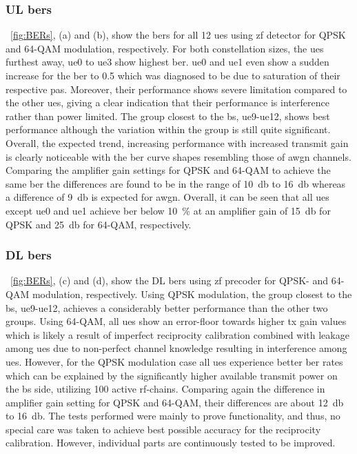 \documentclass[journal]{IEEEtran}
\begin{document}
\subsubsection{UL \glspl{ber}}
\label{subsubsec:indoor_UL_BERs}
\figurename~\ref{fig:BERs}, (a) and (b), show the \glspl{ber} for all 12 \glspl{ue} using \gls{zf} detector for QPSK and 64-QAM modulation, respectively.
%
%
%
%
%
%
%
%
%
%
%
%
%
For both constellation sizes, the \glspl{ue} furthest away, \gls{ue}0 to \gls{ue}3 show highest \gls{ber}.
\gls{ue}0 and \gls{ue}1 even show a sudden increase for the \gls{ber} to 0.5 which was diagnosed to be due to saturation of their respective \glspl{pa}.
Moreover, their performance shows severe limitation compared to the other \glspl{ue}, giving a clear indication that their performance is interference rather than power limited.  
The group closest to the \gls{bs}, \gls{ue}9-\gls{ue}12, shows best performance although the variation within the group is still quite significant.
Overall, the expected trend, increasing performance with increased transmit gain is clearly noticeable with the \gls{ber} curve shapes resembling those of \gls{awgn} channels.
Comparing the amplifier gain settings for QPSK and 64-QAM to achieve the same \gls{ber} the differences are found to be in the range of \SI{10}{\decibel} to \SI{16}{\decibel} whereas a difference of \SI{9}{\decibel} is expected for \gls{awgn}.
%
Overall, it can be seen that all \glspl{ue} except \gls{ue}0 and \gls{ue}1 achieve \gls{ber} below \SI{10}{\percent} at an amplifier gain of \SI{15}{\decibel} for QPSK and \SI{25}{\decibel} for 64-QAM, respectively.
%


\subsubsection{DL \glspl{ber}}
\figurename~\ref{fig:BERs}, (c) and (d), show the DL \glspl{ber} using \gls{zf} precoder for QPSK- and 64-QAM modulation, respectively.
%
%
%
%
%
%
%
%
%
%
%
%
%
Using QPSK modulation, the group closest to the \gls{bs}, \gls{ue}9-\gls{ue}12, achieves a considerably better performance than the other two groups.
Using 64-QAM, all \glspl{ue} show an error-floor towards higher \gls{tx} gain values
which is likely a result of imperfect reciprocity calibration combined with leakage among \glspl{ue} due to non-perfect channel knowledge resulting in interference among \glspl{ue}.
However, for the QPSK modulation case all \glspl{ue} experience better \gls{ber} rates which can be explained by the significantly higher available transmit power on the \gls{bs} side, utilizing 100 active \gls{rf}-chains.
Comparing again the difference in amplifier gain setting for QPSK and 64-QAM, their differences are about \SI{12}{\decibel} to \SI{16}{\decibel}.
The tests performed were mainly to prove functionality, and thus, no special care was taken to achieve best possible accuracy for the reciprocity calibration.
However, individual parts are continuously tested to be improved.
\end{document}
